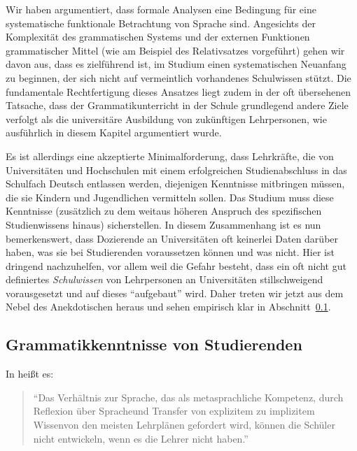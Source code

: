 Wir haben argumentiert, dass formale Analysen eine Bedingung für eine systematische funktionale Betrachtung von Sprache sind.
Angesichts der Komplexität des grammatischen Systems und der externen Funktionen grammatischer Mittel (wie am Beispiel des Relativsatzes vorgeführt) gehen wir davon aus, dass es zielführend ist, im Studium einen systematischen Neuanfang zu beginnen, der sich nicht auf vermeintlich vorhandenes Schulwissen stützt.
Die fundamentale Rechtfertigung dieses Ansatzes liegt zudem in der oft übersehenen Tatsache, dass der Grammatikunterricht in der Schule grundlegend andere Ziele verfolgt als die universitäre Ausbildung von zukünftigen Lehrpersonen, wie ausführlich in diesem Kapitel argumentiert wurde.

Es ist allerdings eine akzeptierte Minimalforderung, dass Lehrkräfte, die von Universitäten und Hochschulen mit einem erfolgreichen Studienabschluss in das Schulfach Deutsch entlassen werden, diejenigen Kenntnisse mitbringen müssen, die sie Kindern und Jugendlichen vermitteln sollen.
Das Studium muss diese Kenntnisse (zusätzlich zu dem weitaus höheren Anspruch des spezifischen Studienwissens hinaus) sicherstellen.
In diesem Zusammenhang ist es nun bemerkenswert, dass Dozierende an Universitäten oft keinerlei Daten darüber haben, was sie bei Studierenden voraussetzen können und was nicht.
Hier ist dringend nachzuhelfen, vor allem weil die Gefahr besteht, dass ein oft nicht gut definiertes \textit{Schulwissen} von Lehrpersonen an Universitäten stillschweigend vorausgesetzt und auf dieses "`aufgebaut"' wird.
Daher treten wir jetzt aus dem Nebel des Anekdotischen heraus und sehen empirisch klar in Abschnitt~\ref{sec:grammatikkentnissevonstudierenden}.

\subsection{Grammatikkenntnisse von Studierenden}
\label{sec:grammatikkentnissevonstudierenden}

In \citet{Eisenberg2004} heißt es:

\begin{quote}
  "`Das Verhältnis zur Sprache, das als \glq metasprachliche Kompetenz\grq, durch \glq Reflexion über Sprache\grq und \glq Transfer von explizitem zu implizitem Wissen\grq von den meisten Lehrplänen gefordert wird, können die Schüler nicht entwickeln, wenn es die Lehrer nicht haben."' \citep[23]{Eisenberg2004}
\end{quote}


